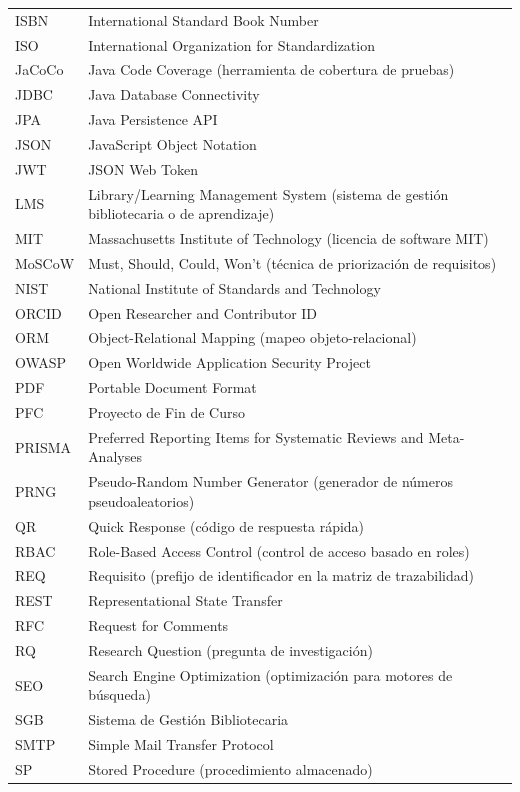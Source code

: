 \documentclass[12pt,a4paper]{report}
\begin{document}
\begin{center}
\begin{longtable}{@{}ll@{}}
ISBN & International Standard Book Number \\
ISO & International Organization for Standardization \\
JaCoCo & Java Code Coverage (herramienta de cobertura de pruebas) \\
JDBC & Java Database Connectivity \\
JPA & Java Persistence API \\
JSON & JavaScript Object Notation \\
JWT & JSON Web Token \\
LMS & Library/Learning Management System (sistema de gestión bibliotecaria o de aprendizaje) \\
MIT & Massachusetts Institute of Technology (licencia de software MIT) \\
MoSCoW & Must, Should, Could, Won't (técnica de priorización de requisitos) \\
NIST & National Institute of Standards and Technology \\
ORCID & Open Researcher and Contributor ID \\
ORM & Object-Relational Mapping (mapeo objeto-relacional) \\
OWASP & Open Worldwide Application Security Project \\
PDF & Portable Document Format \\
PFC & Proyecto de Fin de Curso \\
PRISMA & Preferred Reporting Items for Systematic Reviews and Meta-Analyses \\
PRNG & Pseudo-Random Number Generator (generador de números pseudoaleatorios) \\
QR & Quick Response (código de respuesta rápida) \\
RBAC & Role-Based Access Control (control de acceso basado en roles) \\
REQ & Requisito (prefijo de identificador en la matriz de trazabilidad) \\
REST & Representational State Transfer \\
RFC & Request for Comments \\
RQ & Research Question (pregunta de investigación) \\
SEO & Search Engine Optimization (optimización para motores de búsqueda) \\
SGB & Sistema de Gestión Bibliotecaria \\
SMTP & Simple Mail Transfer Protocol \\
SP & Stored Procedure (procedimiento almacenado) \\

\end{longtable}
\end{center}
\end{document}
